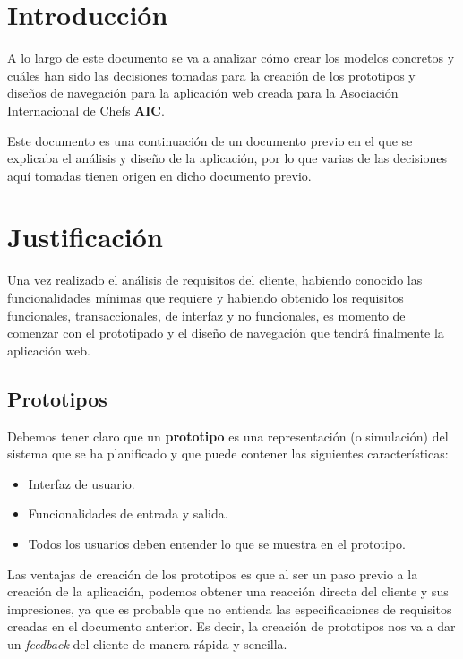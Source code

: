 \documentclass{\ClassPath/viu-tfm-template}
\begin{document}
    \graphicspath{{../../VIU_TFM_LaTeX_template/}}

    \coverpage

    \tableofcontents

\chapter{Introducción}
A lo largo de este documento se va a analizar cómo crear  los modelos concretos y cuáles han sido las decisiones tomadas para la creación de los prototipos y diseños de navegación para la aplicación web creada para la Asociación Internacional de Chefs \textbf{AIC}.

Este documento es una continuación de un documento previo en el que se explicaba el análisis y diseño de la aplicación, por lo que varias de las decisiones aquí tomadas tienen origen en dicho documento previo.


\chapter{Justificación}
Una vez realizado el análisis de requisitos del cliente, habiendo conocido las funcionalidades mínimas que requiere y habiendo obtenido los requisitos funcionales, transaccionales, de interfaz y no funcionales, es momento de comenzar con el prototipado y el diseño de navegación que tendrá finalmente la aplicación web.

\section{Prototipos}
Debemos tener claro que un \textbf{prototipo} es una representación (o simulación) del sistema que se ha planificado y que puede contener las siguientes características:

\vspace{-1em}
\begin{itemize}
    \item Interfaz de usuario.
    \item Funcionalidades de entrada y salida.
    \item Todos los usuarios deben entender lo que se muestra en el prototipo.
\end{itemize}

Las ventajas de creación de los prototipos es que al ser un paso previo a la creación de la aplicación, podemos obtener una reacción directa del cliente y sus impresiones, ya que es probable que no entienda las especificaciones de requisitos creadas en el documento anterior. Es decir, la creación de prototipos nos va a dar un \textit{feedback} del cliente de manera rápida y sencilla.
\end{document}
